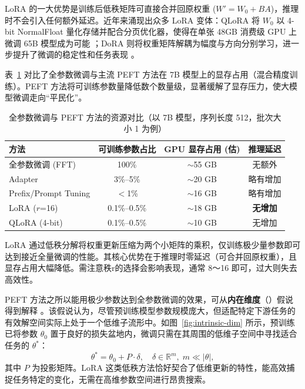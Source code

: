 LoRA 的一大优势是训练后低秩矩阵可直接合并回原权重 ($W' = W_0 + BA$)，推理时不会引入任何额外延迟。近年来涌现出众多 LoRA 变体：QLoRA 将 $W_0$ 以 4-bit NormalFloat 量化存储并配合分页优化器，使得在单张 48GB 消费级 GPU 上微调 65B 模型成为可能 \cite{dettmers-etal:2023qlora}；DoRA 则将权重矩阵解耦为幅度与方向分别学习，进一步提升了微调的稳定性和任务表现 \cite{liu-etal:2024dora}。

表~\ref{tab:peft-memory} 对比了全参数微调与主流 PEFT 方法在 7B 模型上的显存占用（混合精度训练）。PEFT 方法将可训练参数量降低数个数量级，显著缓解了显存压力，使大模型微调走向“平民化”。

\begin{table}[htbp]
\centering
\caption{全参数微调与 PEFT 方法的资源对比（以 7B 模型，序列长度 512，批次大小 1 为例）}
\label{tab:peft-memory}
\begin{tabular}{lccc}
\hline
\textbf{方法} & \textbf{可训练参数占比} & \textbf{GPU 显存占用 (估)} & \textbf{推理延迟} \\
\hline
全参数微调 (FFT) & 100\% & $\sim$55 GB & 无额外 \\
Adapter           & 3\%--5\%  & $\sim$20 GB & 略有增加 \\
Prefix/Prompt Tuning & $<$1\% & $\sim$16 GB & 略有增加 \\
LoRA ($r$=16)     & 0.1\%--0.5\% & $\sim$18 GB & \textbf{无增加} \\
QLoRA (4-bit)     & 0.1\%--0.5\% & $\sim$10 GB & 无增加 \\
\hline
\end{tabular}
\end{table}

\begin{importantnote}
LoRA 通过低秩分解将权重更新压缩为两个小矩阵的乘积，仅训练极少量参数即可达到接近全量微调的性能。其核心优势在于推理时零延迟（可合并回原权重），且显存占用大幅降低。需注意秩r的选择会影响表现，通常 8～16 即可，过大则失去高效性。
\end{importantnote}

PEFT 方法之所以能用极少参数达到全参数微调的效果，可从\textbf{内在维度}（）假说得到解释 \cite{li-etal:2018intrinsic}。该假说认为，尽管预训练模型参数规模庞大，但适配特定下游任务的有效解空间实际上处于一个低维子流形中。如图~\ref{fig:intrinsic-dim} 所示，预训练已将参数 $\theta_0$ 置于良好的损失盆地内，微调只需在其周围的低维子空间中寻找适合任务的 $\theta^*$：
\begin{equation}
\theta^* = \theta_0 + P \cdot \delta,\quad \delta \in \mathbb{R}^m,\; m \ll |\theta|,
\end{equation}
其中 $P$ 为投影矩阵。LoRA 这类低秩方法恰好契合了低维更新的特性，能高效捕捉任务特定的变化，无需在高维参数空间进行昂贵搜索。

